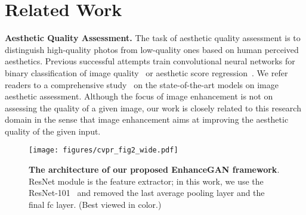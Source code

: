 \documentclass[sigconf]{acmart}
\begin{document}
\section{Related Work}
\label{sec:related_work}
\noindent\textbf{Aesthetic Quality Assessment.}
The task of aesthetic quality assessment is to distinguish high-quality photos from low-quality ones based on human perceived aesthetics. Previous successful attempts train convolutional neural networks for binary classification of image quality~\cite{lu2014rapid,ma2017lamp} or aesthetic score regression~\cite{kong2016photo}. We refer readers to a comprehensive study~\cite{deng2017image} on the state-of-the-art models on image aesthetic assessment. Although the focus of image enhancement is not on assessing the quality of a given image, our work is closely related to this research domain in the sense that image enhancement aims at improving the aesthetic quality of the given input. 


\begin{figure*}
\begin{center}
\texttt{[image: figures/cvpr\_fig2\_wide.pdf]}
\end{center}
\vskip -0.4cm
\caption{\textbf{The architecture of our proposed EnhanceGAN framework}. ResNet module is the feature extractor; in this work, we use the ResNet-101~\cite{he2016deep} and removed the last average pooling layer and the final fc layer. (Best viewed in color.)}
\label{fig:architecture}
\end{figure*}
\end{document}
